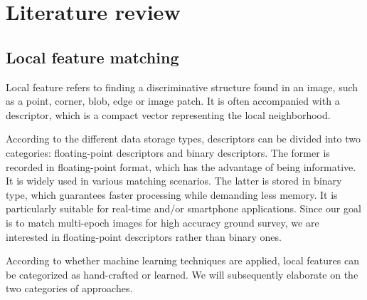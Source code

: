 
\chapter{Literature review}
\label{chap:intro}
\minitoc

\section{Local feature matching}
Local feature refers to finding a discriminative structure found in an image, such as a point, corner, blob, edge or image patch. It is often accompanied with a descriptor, which is a compact vector representing the local neighborhood.
\par
According to the different data storage types, descriptors can be divided into two categories: floating-point descriptors and binary descriptors. The former is recorded in floating-point format, which has the advantage of being informative. It is widely used in various matching scenarios.
The latter is stored in binary type, which guarantees faster processing while demanding less memory. It is particularly suitable for real-time and/or smartphone applications.
Since our goal is to match multi-epoch images for high accuracy ground survey, we are interested in floating-point descriptors rather than binary ones.
\par
According to whether machine learning techniques are applied, local features can be categorized as hand-crafted or learned. We will subsequently elaborate on the two categories of approaches.
